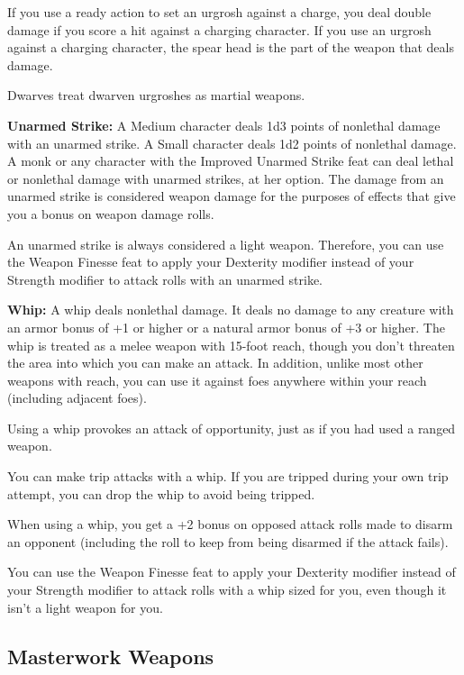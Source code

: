 If you use a ready action to set an urgrosh against a charge, you deal double damage 
if you score a hit against a charging character. If you use an urgrosh against 
a charging character, the spear head is the part of the weapon that deals damage.

Dwarves treat dwarven urgroshes as martial weapons.

\textbf{Unarmed Strike:} A Medium character deals 1d3 points of nonlethal damage 
with an unarmed strike. A Small character deals 1d2 points of nonlethal damage. 
A monk or any character with the Improved Unarmed Strike feat can deal lethal or 
nonlethal damage with unarmed strikes, at her option. The damage from an unarmed 
strike is considered weapon damage for the purposes of effects that give you a 
bonus on weapon damage rolls.

An unarmed strike is always considered a light weapon. Therefore, you can use the 
Weapon Finesse feat to apply your Dexterity modifier instead of your Strength modifier 
to attack rolls with an unarmed strike.

\textbf{Whip:} A whip deals nonlethal damage. It deals no damage to any creature 
with an armor bonus of +1 or higher or a natural armor bonus of +3 or higher. The 
whip is treated as a melee weapon with 15-foot reach, though you don't threaten 
the area into which you can make an attack. In addition, unlike most other weapons 
with reach, you can use it against foes anywhere within your reach (including adjacent 
foes).

Using a whip provokes an attack of opportunity, just as if you had used a ranged 
weapon.

You can make trip attacks with a whip. If you are tripped during your own trip 
attempt, you can drop the whip to avoid being tripped.

When using a whip, you get a +2 bonus on opposed attack rolls made to disarm an 
opponent (including the roll to keep from being disarmed if the attack fails).

You can use the Weapon Finesse feat to apply your Dexterity modifier instead of 
your Strength modifier to attack rolls with a whip sized for you, even though it 
isn't a light weapon for you.

\subsection{Masterwork Weapons}

